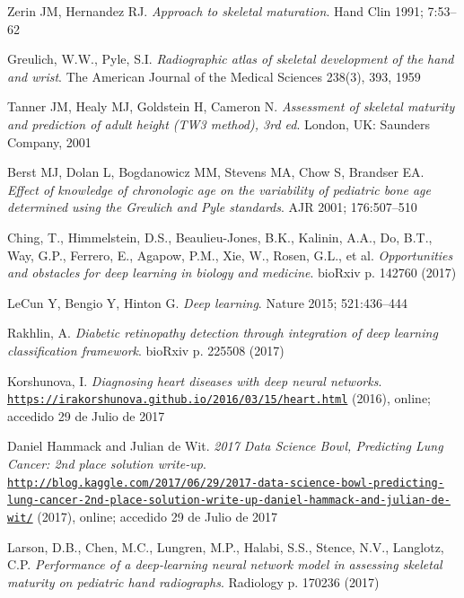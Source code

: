 \documentclass[conference]{IEEEtran}
\begin{document}
\begin{thebibliography}{00}
Zerin JM, Hernandez RJ. 
\textit{Approach to skeletal maturation}. 
Hand Clin 1991; 7:53–62

Greulich, W.W., Pyle, S.I.
\textit{Radiographic atlas of skeletal development of the hand and wrist}. 
The American Journal of the Medical Sciences 238(3), 393, 1959

Tanner JM, Healy MJ, Goldstein H, Cameron N.
\textit{Assessment of skeletal maturity and prediction of adult height (TW3 method), 3rd ed}. 
London, UK: Saunders Company, 2001

Berst MJ, Dolan L, Bogdanowicz MM, Stevens MA, Chow S, Brandser EA.
\textit{Effect of knowledge of chronologic age on the variability of pediatric bone age determined using the Greulich and Pyle standards}. 
AJR 2001; 176:507–510

Ching, T., Himmelstein, D.S., Beaulieu-Jones, B.K., Kalinin, A.A., Do, B.T., Way, G.P., Ferrero, E., Agapow, P.M., Xie, W., Rosen, G.L., et al.
\textit{Opportunities and obstacles for deep learning in biology and medicine}.
bioRxiv p. 142760 (2017)

LeCun Y, Bengio Y, Hinton G.
\textit{Deep learning}.
Nature 2015; 521:436–444

Rakhlin, A.
\textit{Diabetic retinopathy detection through integration of deep learning classification framework}.
bioRxiv p. 225508 (2017)

Korshunova, I.
\textit{Diagnosing heart diseases with deep neural networks}.
\\\texttt{\url{https://irakorshunova.github.io/2016/03/15/heart.html}} (2016), online; accedido 29 de Julio de 2017


Daniel Hammack and Julian de Wit.
\textit{2017 Data Science Bowl, Predicting Lung Cancer: 2nd place solution write-up}.
\\\texttt{\url{http://blog.kaggle.com/2017/06/29/2017-data-science-bowl-predicting-lung-cancer-2nd-place-solution-write-up-daniel-hammack-and-julian-de-wit/}} (2017), online; accedido 29 de Julio de 2017

Larson, D.B., Chen, M.C., Lungren, M.P., Halabi, S.S., Stence, N.V., Langlotz, C.P.
\textit{Performance of a deep-learning neural network model in assessing skeletal maturity on pediatric hand radiographs}.
Radiology p. 170236 (2017)


\end{thebibliography}
\end{document}
